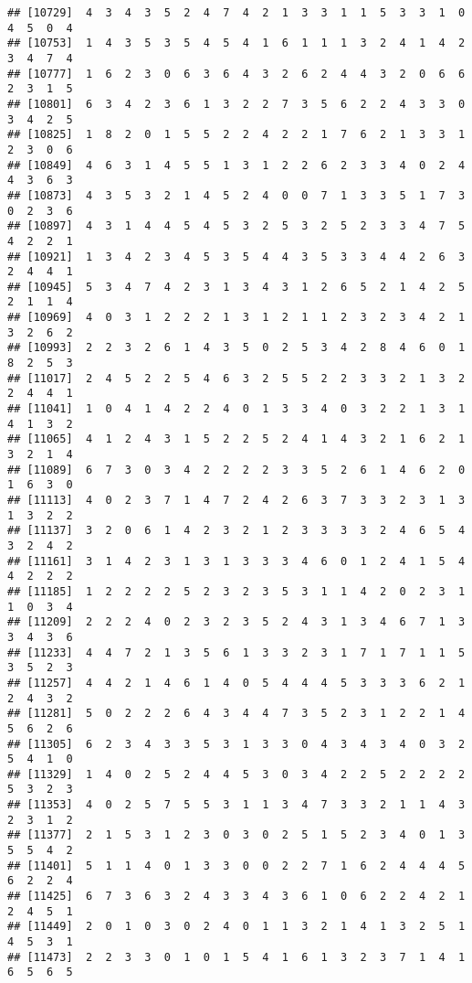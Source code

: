 \documentclass[
]{article}
\begin{document}
\begin{verbatim}
## [10729]  4  3  4  3  5  2  4  7  4  2  1  3  3  1  1  5  3  3  1  0  4  5  0  4
## [10753]  1  4  3  5  3  5  4  5  4  1  6  1  1  1  3  2  4  1  4  2  3  4  7  4
## [10777]  1  6  2  3  0  6  3  6  4  3  2  6  2  4  4  3  2  0  6  6  2  3  1  5
## [10801]  6  3  4  2  3  6  1  3  2  2  7  3  5  6  2  2  4  3  3  0  3  4  2  5
## [10825]  1  8  2  0  1  5  5  2  2  4  2  2  1  7  6  2  1  3  3  1  2  3  0  6
## [10849]  4  6  3  1  4  5  5  1  3  1  2  2  6  2  3  3  4  0  2  4  4  3  6  3
## [10873]  4  3  5  3  2  1  4  5  2  4  0  0  7  1  3  3  5  1  7  3  0  2  3  6
## [10897]  4  3  1  4  4  5  4  5  3  2  5  3  2  5  2  3  3  4  7  5  4  2  2  1
## [10921]  1  3  4  2  3  4  5  3  5  4  4  3  5  3  3  4  4  2  6  3  2  4  4  1
## [10945]  5  3  4  7  4  2  3  1  3  4  3  1  2  6  5  2  1  4  2  5  2  1  1  4
## [10969]  4  0  3  1  2  2  2  1  3  1  2  1  1  2  3  2  3  4  2  1  3  2  6  2
## [10993]  2  2  3  2  6  1  4  3  5  0  2  5  3  4  2  8  4  6  0  1  8  2  5  3
## [11017]  2  4  5  2  2  5  4  6  3  2  5  5  2  2  3  3  2  1  3  2  2  4  4  1
## [11041]  1  0  4  1  4  2  2  4  0  1  3  3  4  0  3  2  2  1  3  1  4  1  3  2
## [11065]  4  1  2  4  3  1  5  2  2  5  2  4  1  4  3  2  1  6  2  1  3  2  1  4
## [11089]  6  7  3  0  3  4  2  2  2  2  3  3  5  2  6  1  4  6  2  0  1  6  3  0
## [11113]  4  0  2  3  7  1  4  7  2  4  2  6  3  7  3  3  2  3  1  3  1  3  2  2
## [11137]  3  2  0  6  1  4  2  3  2  1  2  3  3  3  3  2  4  6  5  4  3  2  4  2
## [11161]  3  1  4  2  3  1  3  1  3  3  3  4  6  0  1  2  4  1  5  4  4  2  2  2
## [11185]  1  2  2  2  2  5  2  3  2  3  5  3  1  1  4  2  0  2  3  1  1  0  3  4
## [11209]  2  2  2  4  0  2  3  2  3  5  2  4  3  1  3  4  6  7  1  3  3  4  3  6
## [11233]  4  4  7  2  1  3  5  6  1  3  3  2  3  1  7  1  7  1  1  5  3  5  2  3
## [11257]  4  4  2  1  4  6  1  4  0  5  4  4  4  5  3  3  3  6  2  1  2  4  3  2
## [11281]  5  0  2  2  2  6  4  3  4  4  7  3  5  2  3  1  2  2  1  4  5  6  2  6
## [11305]  6  2  3  4  3  3  5  3  1  3  3  0  4  3  4  3  4  0  3  2  5  4  1  0
## [11329]  1  4  0  2  5  2  4  4  5  3  0  3  4  2  2  5  2  2  2  2  5  3  2  3
## [11353]  4  0  2  5  7  5  5  3  1  1  3  4  7  3  3  2  1  1  4  3  2  3  1  2
## [11377]  2  1  5  3  1  2  3  0  3  0  2  5  1  5  2  3  4  0  1  3  5  5  4  2
## [11401]  5  1  1  4  0  1  3  3  0  0  2  2  7  1  6  2  4  4  4  5  6  2  2  4
## [11425]  6  7  3  6  3  2  4  3  3  4  3  6  1  0  6  2  2  4  2  1  2  4  5  1
## [11449]  2  0  1  0  3  0  2  4  0  1  1  3  2  1  4  1  3  2  5  1  4  5  3  1
## [11473]  2  2  3  3  0  1  0  1  5  4  1  6  1  3  2  3  7  1  4  1  6  5  6  5

\end{verbatim}
\end{document}
